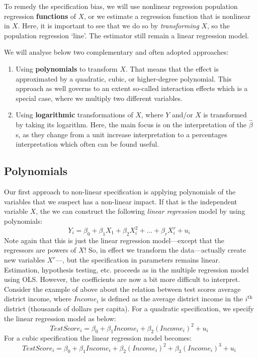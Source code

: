 \documentclass[
]{book}
\providecommand{\tightlist}{%
  \setlength{\itemsep}{0pt}\setlength{\parskip}{0pt}}
\begin{document}
To remedy the specification bias, we will use nonlinear regression population regression \textbf{functions} of \(X\), or we estimate a regression function that is nonlinear in \(X\). Here, it is important to see that we do so by \emph{transforming} \(X\), so the population regression `line'. The estimator still remain a linear regression model.

We will analyse below two complementary and often adopted approaches:

\begin{enumerate}
\def\labelenumi{\arabic{enumi}.}
\tightlist
\item
  Using \textbf{polynomials} to transform \(X\). That means that the effect is approximated by a quadratic, cubic, or higher-degree polynomial. This approach as well governs to an extent so-called interaction effects which is a special case, where we multiply two different variables.
\item
  Using \textbf{logarithmic} transformations of \(X\), where \(Y\) and/or \(X\) is transformed by taking its logarithm. Here, the main focus is on the interpretation of the \(\hat{\beta}\)s, as they change from a unit increase interpretation to a percentages interpretation which often can be found useful.
\end{enumerate}

\hypertarget{polynomials}{%
\subsection{Polynomials}\label{polynomials}}

Our first approach to non-linear specification is applying polynomials of the variables that we suspect has a non-linear impact. If that is the independent variable \(X\), the we can construct the following \emph{linear regression} model by using polynomials:
\begin{equation}
Y_i = \beta_0 + \beta_1 X_1 + \beta_2 X^2_i + \ldots + \beta_r X_i^r + u_i
\label{eq:poly}
\end{equation}
Note again that this is just the linear regression model---except that the regressors are powers of \(X\)! So, in effect we transform the data---actually create new variables \(X^r\)---, but the specification in parameters remains linear. Estimation, hypothesis testing, etc. proceeds as in the multiple regression model using OLS. However, the coefficients are now a bit more difficult to interpret. Consider the example of above about the relation between test scores average district income, where \(Income_i\) is defined as the average district income in the \(i^{\mathrm{th}}\) district (thousands of dollars per capita). For a quadratic specification, we specify the linear regression model as below:
\begin{equation}
TestScore_i = \beta_0 + \beta_1 Income_i + \beta_2 (Income_i)^2 + u_i
\end{equation}
For a cubic specification the linear regression model becomes:
\begin{equation}
TestScore_i = \beta_0 + \beta_1 Income_i + \beta_2 (Income_i)^2 +
\beta_3 (Income_i)^3 + u_i
\end{equation}
\end{document}
